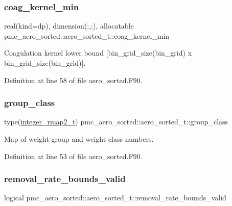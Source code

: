 \subsubsection{\texorpdfstring{coag\+\_\+kernel\+\_\+min}{coag\_kernel\_min}}
{\footnotesize\ttfamily real(kind=dp), dimension(\+:,\+:), allocatable pmc\+\_\+aero\+\_\+sorted\+::aero\+\_\+sorted\+\_\+t\+::coag\+\_\+kernel\+\_\+min}



Coagulation kernel lower bound \mbox{[}{\ttfamily bin\+\_\+grid\+\_\+size(bin\+\_\+grid) x bin\+\_\+grid\+\_\+size(bin\+\_\+grid)}\mbox{]}. 



Definition at line 58 of file aero\+\_\+sorted.\+F90.

\mbox{\label{structpmc__aero__sorted_1_1aero__sorted__t_ab4759ff075d006823e7f184e75f0ccac}} 
\subsubsection{\texorpdfstring{group\+\_\+class}{group\_class}}
{\footnotesize\ttfamily type(\mbox{\hyperlink{structpmc__integer__rmap2_1_1integer__rmap2__t}{integer\+\_\+rmap2\+\_\+t}}) pmc\+\_\+aero\+\_\+sorted\+::aero\+\_\+sorted\+\_\+t\+::group\+\_\+class}



Map of weight group and weight class numbers. 



Definition at line 53 of file aero\+\_\+sorted.\+F90.

\mbox{\label{structpmc__aero__sorted_1_1aero__sorted__t_aced0affcf4290ecdaf8e9b7dbb221ee8}} 
\subsubsection{\texorpdfstring{removal\+\_\+rate\+\_\+bounds\+\_\+valid}{removal\_rate\_bounds\_valid}}
{\footnotesize\ttfamily logical pmc\+\_\+aero\+\_\+sorted\+::aero\+\_\+sorted\+\_\+t\+::removal\+\_\+rate\+\_\+bounds\+\_\+valid}



